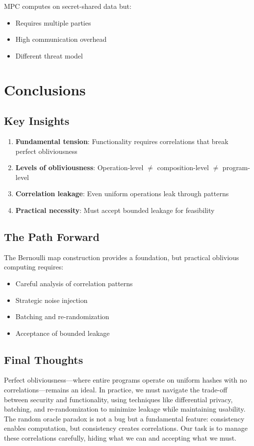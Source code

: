 \documentclass[11pt,final]{article}
\begin{document}
MPC computes on secret-shared data but:
\begin{itemize}
    \item Requires multiple parties
    \item High communication overhead
    \item Different threat model
\end{itemize}

\section{Conclusions}

\subsection{Key Insights}

\begin{enumerate}
    \item \textbf{Fundamental tension}: Functionality requires correlations that break perfect obliviousness
    \item \textbf{Levels of obliviousness}: Operation-level $\neq$ composition-level $\neq$ program-level
    \item \textbf{Correlation leakage}: Even uniform operations leak through patterns
    \item \textbf{Practical necessity}: Must accept bounded leakage for feasibility
\end{enumerate}

\subsection{The Path Forward}

The Bernoulli map construction provides a foundation, but practical oblivious computing requires:
\begin{itemize}
    \item Careful analysis of correlation patterns
    \item Strategic noise injection
    \item Batching and re-randomization
    \item Acceptance of bounded leakage
\end{itemize}

\subsection{Final Thoughts}

Perfect obliviousness—where entire programs operate on uniform hashes with no correlations—remains an ideal. In practice, we must navigate the trade-off between security and functionality, using techniques like differential privacy, batching, and re-randomization to minimize leakage while maintaining usability. The random oracle paradox is not a bug but a fundamental feature: consistency enables computation, but consistency creates correlations. Our task is to manage these correlations carefully, hiding what we can and accepting what we must.


\end{document}
